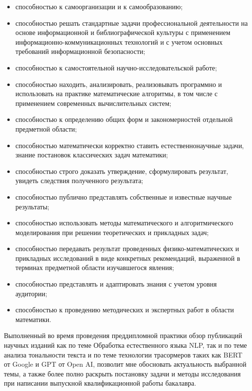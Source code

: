 \begin{itemize}
\item способностью к самоорганизации и к самообразованию;
\item способностью решать стандартные задачи профессиональной деятельности на основе информационной и библиографической культуры с применением информационно-коммуникационных технологий и с учетом основных требований информационной безопасности;
\item способностью к самостоятельной научно-исследовательской работе;
\item способностью находить, анализировать, реализовывать программно и использовать на практике математические алгоритмы, в том числе с применением современных вычислительных систем;
\item способностью к определению общих форм и закономерностей отдельной предметной области;
\item способностью математически корректно ставить естественнонаучные задачи, знание постановок классических задач математики;
\item способностью строго доказать утверждение, сформулировать результат, увидеть следствия полученного результата;
\item способностью публично представлять собственные и известные научные результаты;
\item способностью использовать методы математического и алгоритмического моделирования при решении теоретических и прикладных задач; 
\item способностью передавать результат проведенных физико-математических и прикладных исследований в виде конкретных рекомендаций, выраженной в терминах предметной области изучавшегося явления;
\item способностью представлять и адаптировать знания с учетом уровня аудитории;
\item способностью к проведению методических и экспертных работ в области математики.
\end{itemize}

Выполненный во время проведения преддипломной практики обзор публикаций научных изданий как по теме Обработка естественного языка NLP, так и по теме анализа тональности текста и по теме технологии трасормеров таких как BERT от Google и GPT от Open AI, позволит мне обосновать актуальность выбранной темы, а также более полно раскрыть постановку задачи и методы исследования при написании выпускной квалификационной работы бакалавра.

